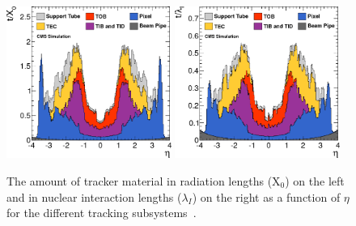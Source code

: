 \begin{figure}
  \includegraphics[width=0.48\textwidth]{cms_experiment/plots/tracker_material.png}
  \includegraphics[width=0.48\textwidth]{cms_experiment/plots/tracker_material_lambda.png}
  \caption[\acs{CMS} tracker material budget]{The amount of \CMS tracker material in radiation lengths (X$_{0}$) on the left and in nuclear interaction lengths ($\lambda_{I}$) on the right as a function of $\eta$ for the different tracking subsystems~\cite{tracker_material}.}
  \label{fig:tracker_material}
\end{figure}

